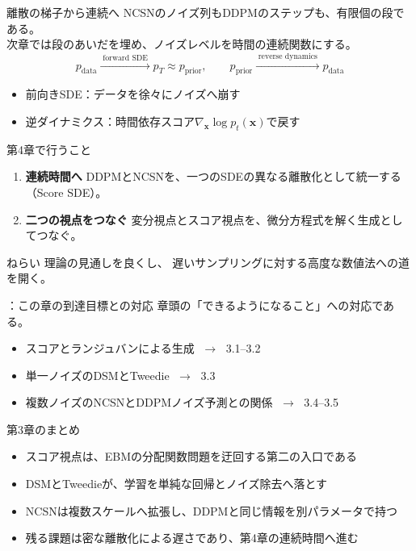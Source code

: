 \asmain
\begin{frame}{離散の梯子から連続へ}
    NCSNのノイズ列もDDPMのステップも、有限個の段である。\\
    次章では段のあいだを埋め、ノイズレベルを時間の連続関数にする。
    \[
        p_{\mathrm{data}}
        \xrightarrow{\;\text{forward SDE}\;}
        p_T\approx p_{\mathrm{prior}},
        \qquad
        p_{\mathrm{prior}}
        \xrightarrow{\;\text{reverse dynamics}\;}
        p_{\mathrm{data}}
    \]
    \begin{itemize}
        \item 前向きSDE：データを徐々にノイズへ崩す
        \item 逆ダイナミクス：時間依存スコア$\nabla_{\bm{x}}\log p_t(\bm{x})$で戻す
    \end{itemize}
\end{frame}
\asmain
\begin{frame}{第4章で行うこと}
    \begin{enumerate}
        \item \textbf{連続時間へ}
        DDPMとNCSNを、一つのSDEの異なる離散化として統一する
        （Score SDE）。
        \item \textbf{二つの視点をつなぐ}
        変分視点とスコア視点を、微分方程式を解く生成としてつなぐ。
    \end{enumerate}
    \begin{block}{ねらい}
        理論の見通しを良くし、
        遅いサンプリングに対する高度な数値法への道を開く。
    \end{block}
\end{frame}
\assuppl
\begin{frame}{\supplmark：この章の到達目標との対応}
    章頭の「できるようになること」への対応である。
    \begin{itemize}
        \item スコアとランジュバンによる生成 $\;\to\;$ 3.1–3.2
        \item 単一ノイズのDSMとTweedie $\;\to\;$ 3.3
        \item 複数ノイズのNCSNとDDPMノイズ予測との関係 $\;\to\;$ 3.4–3.5
    \end{itemize}
\end{frame}
\asmain
\begin{frame}{第3章のまとめ}
    \begin{itemize}
        \item スコア視点は、EBMの分配関数問題を迂回する第二の入口である
        \item DSMとTweedieが、学習を単純な回帰とノイズ除去へ落とす
        \item NCSNは複数スケールへ拡張し、DDPMと同じ情報を別パラメータで持つ
        \item 残る課題は密な離散化による遅さであり、第4章の連続時間へ進む
    \end{itemize}
\end{frame}
